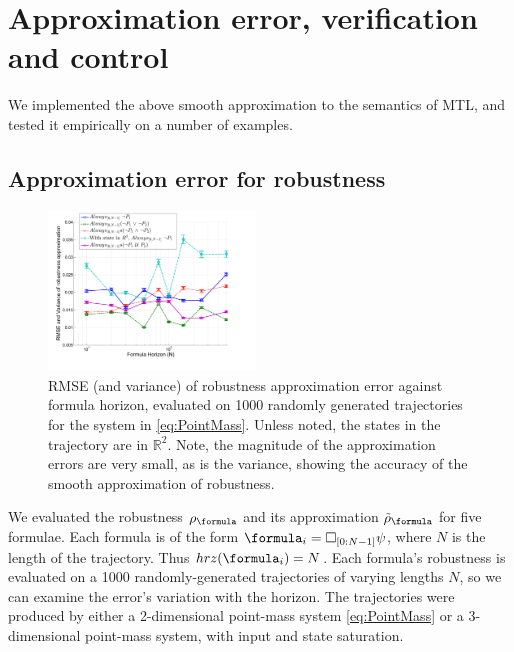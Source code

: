 \section{Approximation error, verification and control}
\label{sec:examples}
We implemented the above smooth approximation to the semantics of MTL, and tested it empirically on a number of examples.

\subsection{Approximation error for robustness}
\label{sec: ex apx error}
\begin{figure}[t]
\centering
\includegraphics[width=0.49\textwidth]{figures/RobustnessError}
\caption{{\small RMSE (and variance) of robustness approximation error against formula horizon, evaluated on 1000 randomly generated trajectories for the system in \eqref{eq:PointMass}. Unless noted, the states in the trajectory are in $\mathbb{R}^2$. Note, the magnitude of the approximation errors are very small, as is the variance, showing the accuracy of the smooth approximation of robustness.}}
\label{fig:sample result}
\end{figure}

We evaluated the robustness $\robf$ and its approximation $\srobf$ for five formulae.
Each formula is of the form $\formula_i = \always_{[0:N-1]} \psi$, where $N$ is the length of the trajectory.
Thus $hrz(\formula_i)  = N$.
Each formula's robustness is evaluated on a 1000 randomly-generated trajectories of varying lengths $N$, so we can  examine the error's variation with the horizon.
The trajectories were produced by either a 2-dimensional point-mass system \eqref{eq:PointMass} or a 3-dimensional point-mass system, with input and state saturation.

